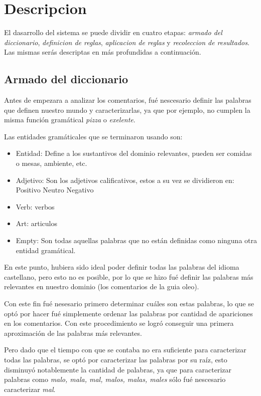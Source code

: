 \section{Descripcion}

El dasarrollo del sistema se puede dividir en cuatro etapas: \emph{armado del diccionario}, \emph{definicion de reglas}, \emph{aplicacion de reglas} y \emph{recoleccion de resultados}. Las mismas serás descriptas en más profundidas a continuación.

\subsection{Armado del diccionario}

Antes de empezara a analizar los comentarios, fué nescesario definir las palabras que definen nuestro mundo y caracterizarlas, ya que por ejemplo, no cumplen la misma función gramátical \emph{pizza} o \emph{exelente}.

Las entidades gramáticales que se terminaron usando son:
\begin{itemize}
\item Entidad: Define a los sustantivos del dominio relevantes, pueden ser comidas o mesas, ambiente, etc.
\item Adjetivo: Son los adjetivos calificativos, estos a su vez se dividieron en:
\subitem Positivo
\subitem Neutro
\subitem Negativo
\item Verb: verbos
\item Art: articulos
\item Empty: Son todas aquellas palabras que no están definidas como ninguna otra entidad gramátical.
\end{itemize}

En este punto, hubiera sido ideal poder definir todas las palabras del idioma castellano, pero esto no es posible, por lo que se hizo fué definir las palabras más relevantes en nuestro dominio (los comentarios de la guia oleo).

Con este fin fué nesesario primero determinar cuáles son estas palabras, lo que se optó por hacer fué simplemente ordenar las palabras por cantidad de apariciones en los comentarios. Con este procedimiento se logró conseguir una primera aproximación de las palabras más relevantes.

Pero dado que el tiempo con que se contaba no era suficiente para caracterizar todas las palabras, se optó por caracterizar las palabras por su raíz, esto disminuyó notablemente la cantidad de palabras, ya que para caracterizar palabras como \emph{malo, mala, mal, malos, malas, males} sólo fué nescesario caracterizar \emph{mal}.

